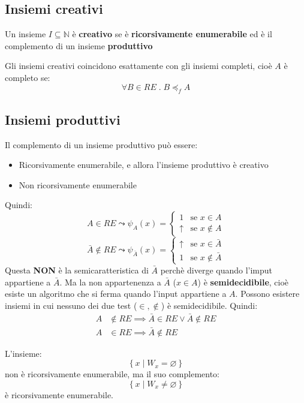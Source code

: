 \documentclass[a4paper]{article}
\begin{document}
\subsection{Insiemi creativi}
\begin{definition}
  Un insieme \( I \subseteq \mathbb{N} \) è \textbf{creativo} se è \textbf{ricorsivamente
  enumerabile} ed è il complemento di un insieme \textbf{produttivo}
\end{definition}
Gli insiemi creativi coincidono esattamente con gli insiemi completi, cioè \( A \) 
è completo se:
\[
  \forall B \in RE \;.\; B \preceq_f A
\] 

\subsection{Insiemi produttivi}
Il complemento di un insieme produttivo può essere:
\begin{itemize}
  \item Ricorsivamente enumerabile, e allora l'insieme produttivo è creativo
  \item Non ricorsivamente enumerabile
\end{itemize}
Quindi:
\[
  A \in RE \leadsto \psi_A(x) =
  \begin{cases}
    1 & \text{se } x \in A \\
    \uparrow & \text{se } x \notin A
  \end{cases}
\] 
\[
  \bar{A} \notin RE \leadsto \psi_{\bar{A}}(x) =
  \begin{cases}
    \uparrow & \text{se } x \in \bar{A} \\
    1 & \text{se } x \notin \bar{A}
  \end{cases}
\] 
Questa \textbf{NON} è la semicaratteristica di \( \bar{A} \) perchè diverge quando l'imput
appartiene a \( \bar{A} \). Ma la non appartenenza a \( \bar{A} \) (\( x \in A \)) è
\textbf{semidecidibile}, cioè esiste un algoritmo che si ferma quando l'input
appartiene a \( A \).
Possono esistere insiemi in cui nessuno dei due test (\( \in, \notin  \)) è semidecidibile.
Quindi:
\[
  \begin{aligned}
    A &\notin RE \implies \bar{A} \in RE \vee \bar{A} \notin RE\\
    A &\in RE \implies \bar{A} \notin RE
  \end{aligned}
\] 
\begin{example}
  L'insieme:
  \[
    \left\{\left. x \;\right|\; W_x = \varnothing \right\}
  \] 
  non è ricorsivamente enumerabile, ma il suo complemento:
  \[
    \left\{\left. x \;\right|\; W_x \neq \varnothing \right\}
  \] 
  è ricorsivamente enumerabile.
\end{example}
\end{document}

